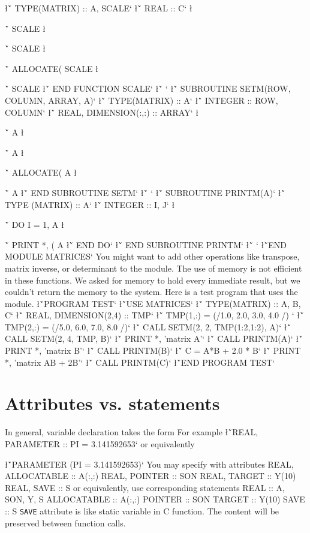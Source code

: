 {{{{{{{{{{\l{\v`      TYPE(MATRIX) :: A, SCALE`\m{}}
\l{\v`      REAL :: C`\m{}}
\l{\v`      SCALE%
\l{\v`      SCALE%
\l{\v`      ALLOCATE( SCALE%
\l{\v`      SCALE%
\l{\v`   END FUNCTION SCALE`\m{}}
\l{\v` `\m{}}
\l{\v`   SUBROUTINE SETM(ROW, COLUMN, ARRAY, A)`}
\l{\v`      TYPE(MATRIX) :: A`\m{}}
\l{\v`      INTEGER :: ROW, COLUMN`\m{}}
\l{\v`      REAL, DIMENSION(:,:) :: ARRAY`\m{}}
\l{\v`      A%
\l{\v`      A%
\l{\v`      ALLOCATE( A%
\l{\v`      A%
\l{\v`   END SUBROUTINE SETM`\m{}}
\l{\v` `\m{}}
\l{\v`   SUBROUTINE PRINTM(A)`}
\l{\v`      TYPE (MATRIX) :: A`\m{}}
\l{\v`      INTEGER :: I, J`\m{}}
\l{\v`      DO I = 1, A%
\l{\v`         PRINT *, ( A%
\l{\v`      END DO`\m{}}
\l{\v`   END SUBROUTINE PRINTM`\m{}}
\l{\v` `\m{}}
\l{\v`END MODULE MATRICES`\m{}}
\sms 
You might want to add other operations like transpose, matrix
inverse, or determinant to  the module.   The use of memory is not efficient
in these functions.  We asked for memory to hold every immediate result,
but we couldn't return the memory to the system. Here is a test program that
uses the module. 
\sms
\l{\v`PROGRAM TEST`\m{}}
\sms
\l{\v`USE MATRICES`\m{}}
\sms
\l{\v`  TYPE(MATRIX) :: A, B, C`\m{}}
\l{\v`  REAL, DIMENSION(2,4) :: TMP`\m{}}
\l{\v`  TMP(1,:) = (/1.0, 2.0, 3.0, 4.0 /)  `\m{}}
\l{\v`  TMP(2,:) = (/5.0, 6.0, 7.0, 8.0 /)`\m{}}
\l{\v`  CALL SETM(2, 2, TMP(1:2,1:2), A)`\m{}}
\l{\v`  CALL SETM(2, 4, TMP, B)`\m{}}
\l{\v`  PRINT *, 'matrix A'`\m{}}
\l{\v`  CALL PRINTM(A)`\m{}}
\l{\v`  PRINT *, 'matrix B'`\m{}}
\l{\v`  CALL PRINTM(B)`\m{}}
\l{\v`  C = A*B + 2.0 * B`\m{}}
\l{\v`  PRINT *, 'matrix AB + 2B'`\m{}}
\l{\v`  CALL PRINTM(C)`\m{}}
\sms
\l{\v`END PROGRAM TEST`\m{}}
\sms

\section{Attributes vs. statements}
In general, variable declaration takes the form
\sms
{}
\sms
For example
\sms
\l{\v`REAL, PARAMETER :: PI = 3.141592653`}
or equivalently\par
{}
\l{\v`PARAMETER (PI = 3.141592653)`}
You may specify with attributes
\ttbg
REAL, ALLOCATABLE :: A(:,:)
REAL, POINTER :: SON
REAL, TARGET :: Y(10)
REAL, SAVE :: S
\tted
or equivalently, use corresponding statements
\ttbg
REAL :: A, SON, Y, S
ALLOCATABLE :: A(:,:)
POINTER :: SON
TARGET :: Y(10)
SAVE :: S
\tted
{\tt SAVE} attribute is like static variable in C function.  The content
will be preserved between function calls.

}}}}}}}}}}}}}}}}}}}}

